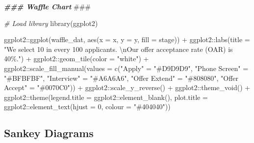 \documentclass[
]{book}
\newenvironment{Shaded}{\begin{snugshade}}{\end{snugshade}}
\newcommand{\AlertTok}[1]{\textcolor[rgb]{0.94,0.16,0.16}{#1}}
\newcommand{\AttributeTok}[1]{\textcolor[rgb]{0.77,0.63,0.00}{#1}}
\newcommand{\CommentTok}[1]{\textcolor[rgb]{0.56,0.35,0.01}{\textit{#1}}}
\newcommand{\DecValTok}[1]{\textcolor[rgb]{0.00,0.00,0.81}{#1}}
\newcommand{\DocumentationTok}[1]{\textcolor[rgb]{0.56,0.35,0.01}{\textbf{\textit{#1}}}}
\newcommand{\FunctionTok}[1]{\textcolor[rgb]{0.00,0.00,0.00}{#1}}
\newcommand{\NormalTok}[1]{#1}
\newcommand{\OtherTok}[1]{\textcolor[rgb]{0.56,0.35,0.01}{#1}}
\newcommand{\SpecialCharTok}[1]{\textcolor[rgb]{0.00,0.00,0.00}{#1}}
\newcommand{\StringTok}[1]{\textcolor[rgb]{0.31,0.60,0.02}{#1}}
\begin{document}
\begin{Shaded}
\begin{Highlighting}[]
\DocumentationTok{\#\#\# Waffle Chart }\AlertTok{\#\#\#}

\CommentTok{\# Load library}
\FunctionTok{library}\NormalTok{(ggplot2)}

\NormalTok{ggplot2}\SpecialCharTok{::}\FunctionTok{ggplot}\NormalTok{(waffle\_dat, }\FunctionTok{aes}\NormalTok{(}\AttributeTok{x =}\NormalTok{ x, }\AttributeTok{y =}\NormalTok{ y, }\AttributeTok{fill =}\NormalTok{ stage)) }\SpecialCharTok{+} 
\NormalTok{ggplot2}\SpecialCharTok{::}\FunctionTok{labs}\NormalTok{(}\AttributeTok{title =} \StringTok{"We select 10 in every 100 applicants. }\SpecialCharTok{\textbackslash{}n}\StringTok{Our offer acceptance rate (OAR) is 40\%."}\NormalTok{) }\SpecialCharTok{+} 
\NormalTok{ggplot2}\SpecialCharTok{::}\FunctionTok{geom\_tile}\NormalTok{(}\AttributeTok{color =} \StringTok{"white"}\NormalTok{) }\SpecialCharTok{+}
\NormalTok{ggplot2}\SpecialCharTok{::}\FunctionTok{scale\_fill\_manual}\NormalTok{(}\AttributeTok{values =} \FunctionTok{c}\NormalTok{(}\StringTok{"Apply"} \OtherTok{=} \StringTok{"\#D9D9D9"}\NormalTok{, }
                                      \StringTok{"Phone Screen"} \OtherTok{=} \StringTok{"\#BFBFBF"}\NormalTok{, }
                                      \StringTok{"Interview"} \OtherTok{=} \StringTok{"\#A6A6A6"}\NormalTok{, }
                                      \StringTok{"Offer Extend"} \OtherTok{=} \StringTok{"\#808080"}\NormalTok{,}
                                      \StringTok{"Offer Accept"} \OtherTok{=} \StringTok{"\#0070C0"}\NormalTok{)) }\SpecialCharTok{+}
\NormalTok{ggplot2}\SpecialCharTok{::}\FunctionTok{scale\_y\_reverse}\NormalTok{() }\SpecialCharTok{+}
\NormalTok{ggplot2}\SpecialCharTok{::}\FunctionTok{theme\_void}\NormalTok{() }\SpecialCharTok{+}
\NormalTok{ggplot2}\SpecialCharTok{::}\FunctionTok{theme}\NormalTok{(}\AttributeTok{legend.title =}\NormalTok{ ggplot2}\SpecialCharTok{::}\FunctionTok{element\_blank}\NormalTok{(),}
               \AttributeTok{plot.title =}\NormalTok{ ggplot2}\SpecialCharTok{::}\FunctionTok{element\_text}\NormalTok{(}\AttributeTok{hjust =} \DecValTok{0}\NormalTok{, }\AttributeTok{colour =} \StringTok{"\#404040"}\NormalTok{))}
\end{Highlighting}
\end{Shaded}

\hypertarget{sankey-diagrams-1}{%
\subsection{Sankey Diagrams}\label{sankey-diagrams-1}}
\end{document}
